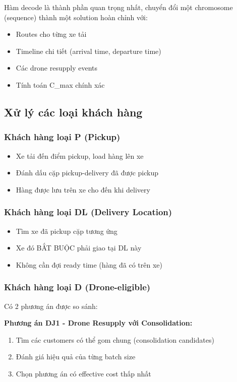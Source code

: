 \documentclass[12pt,a4paper]{article}
\begin{document}
Hàm decode là thành phần quan trọng nhất, chuyển đổi một chromosome (sequence) thành một solution hoàn chỉnh với:
\begin{itemize}
    \item Routes cho từng xe tải
    \item Timeline chi tiết (arrival time, departure time)
    \item Các drone resupply events
    \item Tính toán C\_max chính xác
\end{itemize}

\subsection{Xử lý các loại khách hàng}

\subsubsection{Khách hàng loại P (Pickup)}

\begin{itemize}
    \item Xe tải đến điểm pickup, load hàng lên xe
    \item Đánh dấu cặp pickup-delivery đã được pickup
    \item Hàng được lưu trên xe cho đến khi delivery
\end{itemize}

\subsubsection{Khách hàng loại DL (Delivery Location)}

\begin{itemize}
    \item Tìm xe đã pickup cặp tương ứng
    \item Xe đó BẮT BUỘC phải giao tại DL này
    \item Không cần đợi ready time (hàng đã có trên xe)
\end{itemize}

\subsubsection{Khách hàng loại D (Drone-eligible)}

Có 2 phương án được so sánh:

\textbf{Phương án DJ1 - Drone Resupply với Consolidation:}
\begin{enumerate}
    \item Tìm các customers có thể gom chung (consolidation candidates)
    \item Đánh giá hiệu quả của từng batch size
    \item Chọn phương án có effective cost thấp nhất
\end{enumerate}
\end{document}
